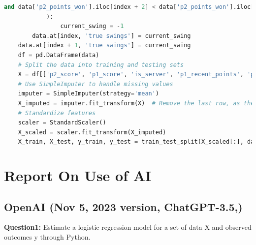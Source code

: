 \documentclass[UTF8]{ctexart} %
\begin{document}
\begin{lstlisting}[language=Python, caption=Code of Data Cleaning and Logistic Regression Model]
                and data['p2_points_won'].iloc[index + 2] < data['p2_points_won'].iloc[index + 3]
            ):
                current_swing = -1
        data.at[index, 'true swings'] = current_swing
    data.at[index + 1, 'true swings'] = current_swing
    df = pd.DataFrame(data)
    # Split the data into training and testing sets
    X = df[['p2_score', 'p1_score', 'is_server', 'p1_recent_points', 'p2_recent_points', 'score_difference_last_5', 'run_difference', 'p1_ace_count', 'p2_ace_count', 'p1_winner_count', 'p2_winner_count', 'p1_unf_err_count', 'p2_unf_err_count', 'p1_break_pt_count', 'p2_break_pt_count', 'p1_break_pt_won_count', 'p2_break_pt_won_count']]
    # Use SimpleImputer to handle missing values
    imputer = SimpleImputer(strategy='mean')
    X_imputed = imputer.fit_transform(X)  # Remove the last row, as the last row of 'next_point_victor' is NaN
    # Standardize features
    scaler = StandardScaler()
    X_scaled = scaler.fit_transform(X_imputed)
    X_train, X_test, y_train, y_test = train_test_split(X_scaled[:], data['true swings'], test_size=0.2, random_performance=42)
\end{lstlisting} 

\section*{Report On Use of AI}  
\subsection*{OpenAI (Nov 5, 2023 version, ChatGPT-3.5,)}
\textbf{Question1:} 
Estimate a logistic regression model for a set of data X and observed outcomes y through Python.
\end{document}
